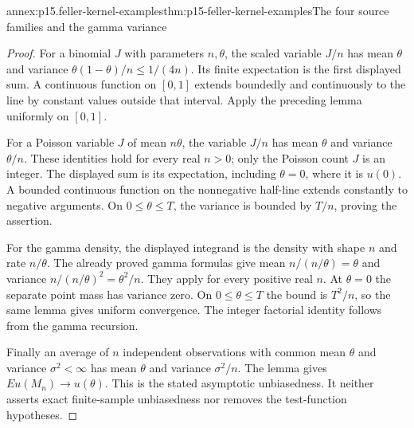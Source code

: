 \begin{annexitem}{annex:p15.feller-kernel-examples}{thm:p15-feller-kernel-examples}{The four source families and the gamma variance}
\begin{proof}
For a binomial \(J\) with parameters \(n,\theta\), the scaled variable
\(J/n\) has mean \(\theta\) and variance \(\theta(1-\theta)/n\leq1/(4n)\).
Its finite expectation is the first displayed sum.
A continuous function on \([0,1]\) extends boundedly and continuously
to the line by constant values outside that interval.
Apply the preceding lemma uniformly on \([0,1]\).

For a Poisson variable \(J\) of mean \(n\theta\), the variable \(J/n\)
has mean \(\theta\) and variance \(\theta/n\).
These identities hold for every real \(n>0\); only the Poisson count
\(J\) is an integer. The displayed sum is its expectation, including
\(\theta=0\), where it is \(u(0)\).
A bounded continuous function on the nonnegative half-line extends
constantly to negative arguments. On \(0\leq\theta\leq T\), the
variance is bounded by \(T/n\), proving the assertion.

For the gamma density, the displayed integrand is the density with
shape \(n\) and rate \(n/\theta\).
The already proved gamma formulas give mean
\(n/(n/\theta)=\theta\) and variance
\(n/(n/\theta)^2=\theta^2/n\).
They apply for every positive real \(n\).
At \(\theta=0\) the separate point mass has variance zero.
On \(0\leq\theta\leq T\) the bound is \(T^2/n\), so the same lemma
gives uniform convergence. The integer factorial identity follows
from the gamma recursion.

Finally an average of \(n\) independent observations with common
mean \(\theta\) and variance \(\sigma^2<\infty\) has mean \(\theta\)
and variance \(\sigma^2/n\). The lemma gives \(E u(M_n)\to u(\theta)\).
This is the stated asymptotic unbiasedness. It neither asserts exact
finite-sample unbiasedness nor removes the test-function hypotheses.
\end{proof}
\end{annexitem}

